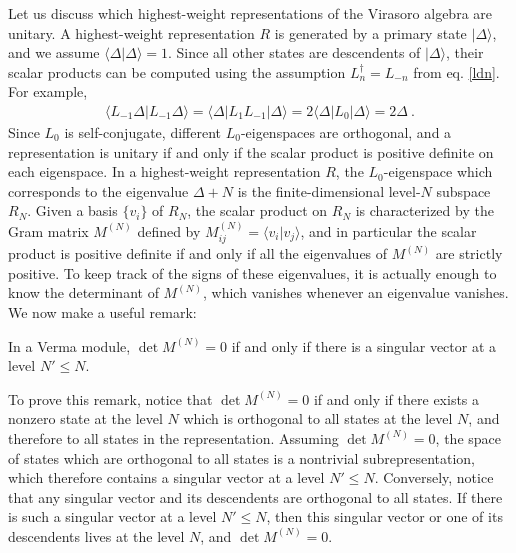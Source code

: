 \documentclass[12pt, a4paper, notitlepage, twoside]{report}
\numberwithin{equation}{section}
\theoremstyle{break}
\begin{document}
Let us discuss which highest-weight representations of the Virasoro algebra are unitary.
A highest-weight representation $R$ is generated by a primary state $|\Delta\rangle$, and we assume $\langle \Delta|\Delta\rangle =1$.
Since all other states are descendents of $|\Delta\rangle$, their scalar products can be computed using the assumption $L_n^\dagger = L_{-n}$ from eq. \eqref{ldn}.
For example,
\begin{align}
 \langle L_{-1} \Delta|L_{-1}\Delta\rangle = \langle \Delta |L_1 L_{-1}|\Delta\rangle = 2\langle \Delta|L_0|\Delta\rangle = 2\Delta\ . 
\label{levo} 
\end{align}
Since $L_0$ is self-conjugate, different $L_0$-eigenspaces are orthogonal, and a representation is unitary if and only if the scalar product is positive definite on each eigenspace. 
In a highest-weight representation $R$, the $L_0$-eigenspace which corresponds to the eigenvalue $\Delta+N$ is the finite-dimensional level-$N$ subspace $R_N$.
Given a basis $\{v_i\}$ of $R_N$, the scalar product on $R_N$ is characterized by the Gram matrix $M^{(N)}$ defined by $M^{(N)}_{ij}=\langle v_i|v_j\rangle$, and in particular the scalar product is positive definite if and only if all the eigenvalues of $M^{(N)}$ are strictly positive.
To keep track of the signs of these eigenvalues, it is actually enough to know the determinant of $M^{(N)}$, which vanishes whenever an eigenvalue vanishes. 
We now make a useful remark:
\begin{center}
 \begin{minipage}{0.9\textwidth}
 In a Verma module, $\det M^{(N)}=0$ if and only if there is a singular vector at a level $N'\leq N$.  
 \end{minipage}
\end{center}
To prove this remark, notice that $\det M^{(N)}=0$ if and only if there exists a nonzero state at the level $N$ which is orthogonal to all states at the level $N$, and therefore to all states in the representation.
Assuming $\det M^{(N)}=0$, the space of states which are orthogonal to all states is a nontrivial subrepresentation, which therefore contains a singular vector at a level $N'\leq N$. 
Conversely, notice that any singular vector and its descendents are orthogonal to all states.
If there is such a singular vector at a level $N'\leq N$, then this singular vector or one of its descendents lives at the level $N$, and $\det M^{(N)}=0$.
\end{document}
